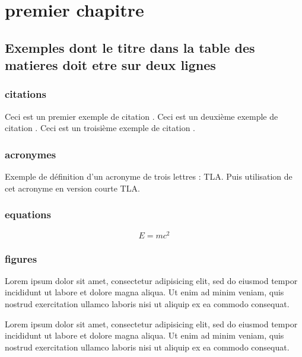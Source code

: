 \chapter{premier chapitre}
	
\section{Exemples dont le titre dans la table des matieres doit etre sur deux lignes} 

\subsection{citations} 

Ceci est un premier exemple de citation \cite{Ful83}. Ceci est un deuxième exemple de citation \citep{GMP81}. Ceci est un troisième exemple de citation \citet{PP98}.

\subsection{acronymes} 

Exemple de définition d'un acronyme de trois lettres : \ac{TLA}. Puis utilisation de cet acronyme en version courte \acs{TLA}.

\subsection{equations}   

\begin{equation}
E=mc^2	
\end{equation}

\subsection{figures}   

Lorem ipsum dolor sit amet, consectetur adipisicing elit, sed do eiusmod
tempor incididunt ut labore et dolore magna aliqua. Ut enim ad minim veniam,
quis nostrud exercitation ullamco laboris nisi ut aliquip ex ea commodo
consequat.

Lorem ipsum dolor sit amet, consectetur adipisicing elit, sed do eiusmod
tempor incididunt ut labore et dolore magna aliqua. Ut enim ad minim veniam,
quis nostrud exercitation ullamco laboris nisi ut aliquip ex ea commodo
consequat.


